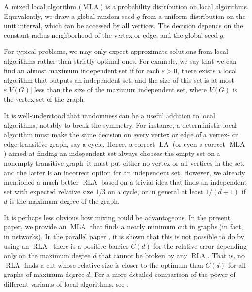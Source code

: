 \documentclass[12pt,a4paper]{article}
\newcommand{\eps}{\varepsilon}
\renewcommand{\:}{\colon}
\DeclareMathOperator{\LA}{LA}
\DeclareMathOperator{\RLA}{RLA}
\DeclareMathOperator{\MLA}{MLA}
\begin{document}
A mixed local algorithm ($\MLA$) is a probability distribution on local algorithms. 
Equivalently, we draw a global random seed $g$ from a uniform distribution on the unit interval, which can be accessed by all vertices. 
The decision depends on the constant radius neighborhood of the vertex or edge, and the global seed $g$. 


For typical problems, we may only expect approximate solutions from local algorithms rather than strictly optimal ones. 
For example, we say that we can find an almost maximum independent set if for each $\eps > 0$, there exists a local algorithm that outputs an independent set, and the size of this set is at most $\eps |V(G)|$ less than the size of the maximum independent set, where $V(G)$ is the vertex set of the graph. 

It is well-understood that randomness can be a useful addition to local algorithms, notably to break the symmetry. 
For instance, a deterministic local algorithm must make the same decision on every vertex or edge of a vertex- or edge transitive graph, say a cycle. 
Hence, a correct $\LA$ (or even a correct $\MLA$) aimed at finding an independent set always chooses the empty set on a nonempty transitive graph: it must put either no vertex or all vertices in the set, and the latter is an incorrect option for an independent set. 
However, we already mentioned a much better $\RLA$ based on a trivial idea that finds an independent set with expected relative size $1/3$ on a cycle, or in general at least $1/(d+1)$ if $d$ is the maximum degree of the graph. 

It is perhaps less obvious how mixing could be advantageous. 
In the present paper, we provide an $\MLA$ that finds a nearly minimum cut in graphs (in fact, in networks). 
In the parallel paper \cite{Csoka}, it is shown that this is not possible to do by using an $\RLA$: there is a positive barrier $C(d)$ for the relative error depending only on the maximum degree $d$ that cannot be broken by any $\RLA$. 
That is, no $\RLA$ finds a cut whose relative size is closer to the optimum than $C(d)$ for all graphs of maximum degree $d$. 
For a more detailed comparison of the power of different variants of local algorithms, see \cite{Csoka}. 
\end{document}
